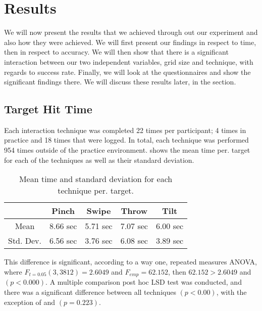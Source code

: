 \section{Results}
We will now present the results that we achieved through out our experiment and also how they were achieved. We will first present our findings in respect to time, then in respect to accuracy. We will then show that there is a significant interaction between our two independent variables, grid size and technique, with regards to success rate. Finally, we will look at the questionnaires and show the significant findings there. We will discuss these results later, in the  section.  

\subsection{Target Hit Time}

Each interaction technique was completed 22 times per participant; 4 times in practice and 18 times that were logged. In total, each technique was performed 954 times outside of the practice environment.  shows the mean time per. target for each of the techniques as well as their standard deviation. 
\begin{table}[H]
	\centering
	\begin{tabular}{|c|c|c|c|c|}
		\hline
		\rowcolor[HTML]{9B9B9B} 
		 & \textbf{Pinch} & \textbf{Swipe} & \textbf{Throw} & \textbf{Tilt} \\ \hline
		Mean & 8.66  sec         & 5.71 sec          & 7.07 sec          & 6.00 sec         \\ \hline
		Std. Dev. & 6.56 sec & 3.76 sec & 6.08 sec & 3.89 sec \\ \hline
	\end{tabular}
	\caption{Mean time and standard deviation for each technique per. target.}
	\label{tab:meanTimesTechnique}
\end{table}

This difference is significant, according to a way one, repeated measures ANOVA, where $F_{t=0.05}(3,3812)= 2.6049$ and $F_{emp}=62.152$, then $62.152 > 2.6049$ and $(p<0.000)$. A multiple comparison post hoc LSD test was conducted, and there was a significant difference between all techniques $(p<0.00)$, with the exception of \swipe and \tilt $(p=0.223)$. 

